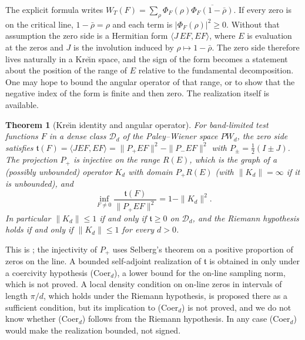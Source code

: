 \documentclass[11pt]{amsart}
\newtheorem{theorem}{Theorem}[section]
\theoremstyle{definition}
\theoremstyle{remark}
\numberwithin{equation}{section}
\newcommand{\PhiF}{\Phi_F}                             %
\newcommand{\WT}{W_T}                                  %
\begin{document}
The explicit formula writes $\WT(F)=\sum_\rho \PhiF(\rho)\overline{\PhiF(1-\bar\rho)}$. If every
zero is on the critical line, $1-\bar\rho=\rho$ and each term is $|\PhiF(\rho)|^2\ge0$. Without
that assumption the zero side is a Hermitian form $\langle J\,EF,EF\rangle$, where $E$ is
evaluation at the zeros and $J$ is the involution induced by $\rho\mapsto1-\bar\rho$. The zero side
therefore lives naturally in a Kre\u{\i}n space, and the sign of the form becomes a statement about
the position of the range of $E$ relative to the fundamental decomposition. One may hope to bound
the angular operator of that range, or to show that the negative index of the form is finite and
then zero. The realization itself is available.

\begin{theorem}[Kre\u{\i}n identity and angular operator]\label{w6:thm:krein}
For band-limited test functions $F$ in a dense class $\mathcal D_d$ of the Paley--Wiener space
$PW_d$, the zero side satisfies $\mathfrak t(F)=\langle JEF,EF\rangle=\|P_+EF\|^2-\|P_-EF\|^2$ with
$P_\pm=\frac12(I\pm J)$. The projection $P_+$ is injective on the range $R(E)$, which is the graph
of a (possibly unbounded) operator $K_d$ with domain $P_+R(E)$ (with $\|K_d\|=\infty$ if it is unbounded), and
\[
\inf_{F\neq0}\frac{\mathfrak t(F)}{\|P_+EF\|^2}=1-\|K_d\|^2 .
\]
In particular $\|K_d\|\le1$ if and only if $\mathfrak t\ge0$ on $\mathcal D_d$, and the Riemann
hypothesis holds if and only if $\|K_d\|\le1$ for every $d>0$.
\end{theorem}

This is \cite[Theorem~1.2 and Proposition~1.3]{P08}; the injectivity of $P_+$ uses Selberg's
theorem on a positive proportion of zeros on the line. A bounded self-adjoint realization of
$\mathfrak t$ is obtained in \cite[Theorem~1.1]{P08} only under a coercivity hypothesis
(Coer$_d$), a lower bound for the on-line sampling norm, which is not proved. A local density
condition on on-line zeros in intervals of length $\pi/d$, which holds under the Riemann
hypothesis, is proposed there as a sufficient condition, but its implication to (Coer$_d$) is not
proved, and we do not know whether (Coer$_d$) follows from the Riemann hypothesis. In any case
(Coer$_d$) would make the realization bounded, not signed.
\end{document}
